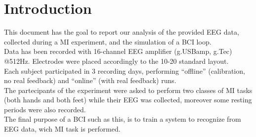 \section{Introduction}
This document has the goal to report our analysis of the provided EEG data, collected during a MI experiment, and the simulation of a BCI loop. \\
Data has been recorded with 16-channel EEG amplifier (g.USBamp, g.Tec) @512Hz. Electrodes were placed accordingly to the 10-20 standard layout. \\
Each subject participated in 3 recording days, performing  “offline” (calibration, no real feedback) and  “online” (with real feedback) runs. \\
The partecipants of the experiment were asked to perform two classes of MI tasks (both hands and both feet) while their EEG was collected, moreover some resting periods were also recorded.\\
The final purpose of a BCI such as this, is to train a system to recognize from EEG data, wich MI task is performed.
